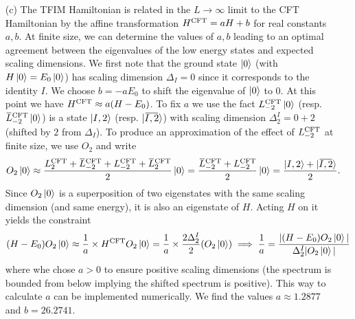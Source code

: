 \documentclass[10pt, a4paper]{article}
\begin{document}
{\begin{enumerate}
  \item[(c)] The TFIM Hamiltonian is related in the $L\to \infty$ limit to the CFT Hamiltonian by the affine transformation $H^{\rm CFT} = a H  + b$ for real constants $a, b$. At finite size, we can determine the values of $a, b$ leading to an optimal agreement between the eigenvalues of the low energy states and expected scaling dimensions. We first note that the ground state $\ket{0}$ (with $H \ket{0} = E_0 \ket{0}$) has scaling dimension $\Delta_I = 0$ since it corresponds to the identity $I$. We choose $b = -a E_0$ to shift the eigenvalue of $\ket{0}$ to $0$. At this point we have $H^{\rm CFT} \approx a (H  - E_0)$. To fix $a$ we use the fact $L^{\rm CFT}_{-2} \ket{0}$ (resp. $\bar{L}^{\rm CFT}_{-2} \ket{0}$) is a state $\ket{I, 2}$ (resp. $\ket{\bar{I, 2}}$) with scaling dimension $\Delta_{2}^{I} = 0 + 2$ (shifted by $2$ from $\Delta_I$). To produce an approximation of the effect of $L_{-2}^{\rm CFT}$ at finite size, we use $O_2$ and write 
  \begin{align*}
    O_2 \ket{0} \approx \frac{L_2^{\rm C F T}+\bar{L}_{-2}^{\rm C F T}+L_{-2}^{\rm C F T}+\bar{L}_2^{\rm C F T}}{2} \ket{0} = \frac{\bar{L}_{-2}^{\rm C F T}+L_{-2}^{\rm C F T}}{2} \ket{0} = \frac{\ket{I, 2} + \ket{\bar{I, 2}}}{2}.
  \end{align*}
  Since $O_2 \ket{0}$ is a superposition of two eigenstates with the same scaling dimension (and same energy), it is also an eigenstate of $H$. Acting $H$ on it yields the constraint 
  \begin{align*}
    (H - E_0) O_2 \ket{0} \approx \frac{1}{a} \times H^{\rm CFT} O_2 \ket{0} = \frac{1}{a} \times \frac{2\Delta_2^I}{2}(O_2 \ket{0}) \implies \frac{1}{a} = \frac{|(H - E_0) O_2 \ket{0}|}{\Delta_2^I|O_2 \ket{0}|}
  \end{align*}
  where whe chose $a > 0$ to ensure positive scaling dimensions (the spectrum is bounded from below implying the shifted spectrum is positive). This way to calculate $a$ can be implemented numerically. We find the values $a \approx 1.2877$ and $b = 26.2741$. 
  

\end{enumerate}}
\end{document}
